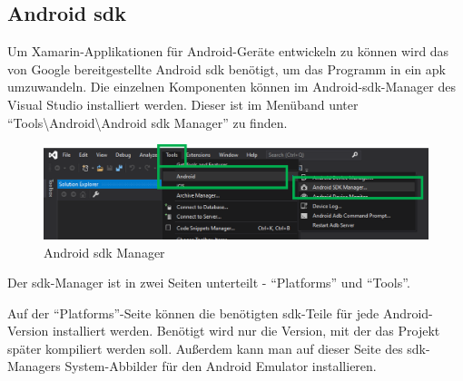 \subsection{Android \ac{sdk}}
Um Xamarin-Applikationen für Android-Geräte entwickeln zu können wird das von Google bereitgestellte Android \ac{sdk} benötigt, um das Programm in ein \ac{apk} umzuwandeln. Die einzelnen Komponenten können im Android-\ac{sdk}-Manager des Visual Studio installiert werden.
Dieser ist im Menüband unter \enquote{Tools\textbackslash Android\textbackslash Android \ac{sdk} Manager} zu finden.
\begin{figure}[H]
    \centering\includegraphics[width=0.9\linewidth]{images/auswahl_rahmenwerk/android_sdk_installation.png}    
    \caption{Android \ac{sdk} Manager}
\end{figure}
Der \ac{sdk}-Manager ist in zwei Seiten unterteilt - \enquote{Platforms} und \enquote{Tools}.\par

Auf der \enquote{Plat\-forms}-Seite können die benötigten \ac{sdk}-Teile für jede Android-Version installiert werden.
Benötigt wird nur die Version, mit der das Projekt später kompiliert werden soll.
Außerdem kann man auf dieser Seite des \ac{sdk}-Managers System-Abbilder für den Android Emulator installieren.\par

